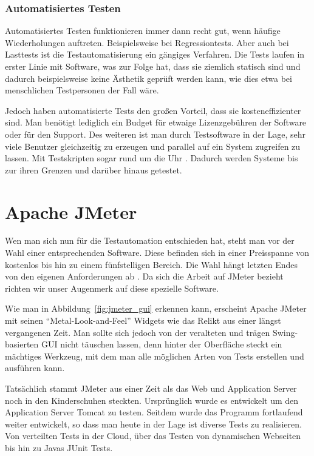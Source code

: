 \documentclass[a4paper,12pt]{article}
\begin{document}
\subsubsection{Automatisiertes Testen}
Automatisiertes Testen funktionieren immer dann recht gut, wenn häufige Wiederholungen auftreten. Beispielsweise bei Regressiontests. Aber auch bei Lasttests ist die Testautomatisierung ein gängiges Verfahren. Die Tests laufen in erster Linie mit Software, was zur Folge hat, dass sie ziemlich statisch sind und dadurch beispielsweise keine Ästhetik geprüft werden kann, wie dies etwa bei menschlichen Testpersonen der Fall wäre.

Jedoch haben automatisierte Tests den großen Vorteil, dass sie kosteneffizienter sind. Man benötigt lediglich ein Budget für etwaige Lizenzgebühren der Software oder für den Support. Des weiteren ist man durch Testsoftware in der Lage, sehr viele Benutzer gleichzeitig zu erzeugen und parallel auf ein System zugreifen zu lassen. Mit Testskripten sogar rund um die Uhr \cite{online:Testautomatisierung}. Dadurch werden Systeme bis zur ihren Grenzen und darüber hinaus getestet.

\section{Apache JMeter}
Wen man sich nun für die Testautomation entschieden hat, steht man vor der Wahl einer entsprechenden Software. Diese befinden sich in einer Preisspanne von kostenlos bis hin zu einem fünfstelligen Bereich. Die Wahl hängt letzten Endes von den eigenen Anforderungen ab \cite[S. 15]{book:ApacheJMeter}. Da sich die Arbeit auf JMeter bezieht richten wir unser Augenmerk auf diese spezielle Software.

Wie man in Abbildung~\ref{fig:jmeter_gui} erkennen kann, erscheint Apache JMeter mit seinen "`Metal-Look-and-Feel"' \cite{online:wikiSwing} Widgets wie das Relikt aus einer längst vergangenen Zeit. Man sollte sich jedoch von der veralteten und trägen Swing-basierten GUI nicht täuschen lassen, denn hinter der Oberfläche steckt ein mächtiges Werkzeug, mit dem man alle möglichen Arten von Tests erstellen und ausführen kann. \cite{online:heiseJMeterOderGatling}

Tatsächlich stammt JMeter aus einer Zeit als das Web und Application Server noch in den Kinderschuhen steckten. Ursprünglich wurde es entwickelt um den Application Server Tomcat zu testen. Seitdem wurde das Programm fortlaufend weiter entwickelt, so dass man heute in der Lage ist diverse Tests zu realisieren. Von verteilten Tests in der Cloud, über das Testen von dynamischen Webseiten bis hin zu Javas JUnit Tests. \cite{online:ApacheJMeter}
\end{document}
